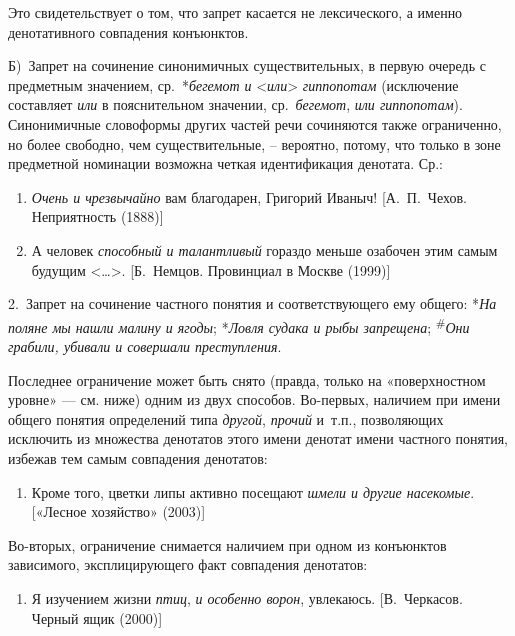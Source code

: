 Это свидетельствует о том, что запрет касается не лексического, а именно
денотативного совпадения конъюнктов.

Б)~Запрет на сочинение синонимичных существительных, в первую очередь с
предметным значением, ср.~*\textit{бегемот и}
\textless{}\textit{или}\textgreater{} \textit{гиппопотам} (исключение
составляет \textit{или} в пояснительном значении, ср.~\textit{бегемот},
\textit{или гиппопотам}). Синонимичные словоформы других частей речи
сочиняются также ограниченно, но более свободно, чем существительные, --
вероятно, потому, что только в зоне предметной номинации возможна четкая
идентификация денотата. Ср.:

\begin{enumerate}
  \def\labelenumi{(\arabic{enumi})}
  \setcounter{enumi}{18}
  \item
        \textit{Очень и чрезвычайно} вам благодарен, Григорий Иваныч!
        {[}А.~П.~Чехов. Неприятность (1888){]}
  \item
        А человек \textit{способный и талантливый} гораздо меньше озабочен этим
        самым будущим \textless\ldots\textgreater. {[}Б.~Немцов. Провинциал в
        Москве (1999){]}
\end{enumerate}

2.~Запрет на сочинение частного понятия и соответствующего ему общего:
*\textit{На поляне мы нашли малину и ягоды}; *\textit{Ловля судака и рыбы
  запрещена}; \textsuperscript{\#}\textit{Они грабили, убивали и совершали
  преступления}.

Последнее ограничение может быть снято (правда, только на «поверхностном
уровне» --- см. ниже) одним из двух способов. Во-первых, наличием при
имени общего понятия определений типа \textit{другой}, \textit{прочий}
и~т.п., позволяющих исключить из множества денотатов этого имени денотат
имени частного понятия, избежав тем самым совпадения денотатов:

\begin{enumerate}
  \def\labelenumi{(\arabic{enumi})}
  \setcounter{enumi}{20}
  \item
        Кроме того, цветки липы активно посещают \textit{шмели и другие
          насекомые}. {[}«Лесное хозяйство» (2003){]}
\end{enumerate}

Во-вторых, ограничение снимается наличием при одном из конъюнктов
зависимого, эксплицирующего факт совпадения денотатов:

\begin{enumerate}
  \def\labelenumi{(\arabic{enumi})}
  \setcounter{enumi}{21}
  \item
        Я изучением жизни \textit{птиц}, \textit{и особенно ворон}, увлекаюсь.
        {[}В.~Черкасов. Черный ящик (2000){]}
\end{enumerate}


